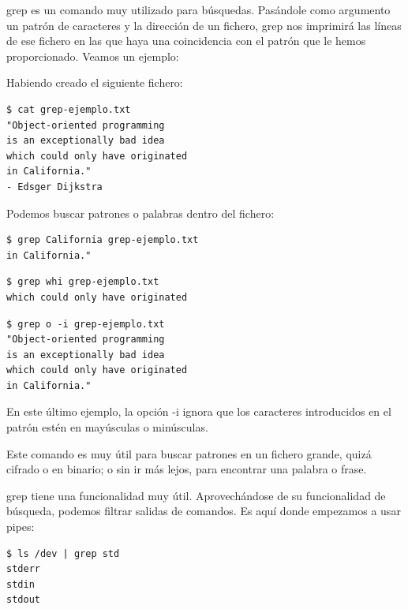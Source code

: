 grep es un comando muy utilizado para búsquedas. Pasándole como argumento un patrón de caracteres y la dirección de un fichero, grep nos imprimirá las líneas de ese fichero en las que haya una coincidencia con el patrón que le hemos proporcionado. Veamos un ejemplo:

Habiendo creado el siguiente fichero:

\begin{tcolorbox-code}
\begin{lstlisting}
$ cat grep-ejemplo.txt
"Object-oriented programming
is an exceptionally bad idea
which could only have originated
in California."
- Edsger Dijkstra
\end{lstlisting}
\end{tcolorbox-code}

Podemos buscar patrones o palabras dentro del fichero:

\begin{tcolorbox-code}
\begin{lstlisting}
$ grep California grep-ejemplo.txt
in California."
\end{lstlisting}
\end{tcolorbox-code}

\begin{tcolorbox-code}
\begin{lstlisting}
$ grep whi grep-ejemplo.txt
which could only have originated
\end{lstlisting}
\end{tcolorbox-code}

\begin{tcolorbox-code}
\begin{lstlisting}
$ grep o -i grep-ejemplo.txt
"Object-oriented programming
is an exceptionally bad idea
which could only have originated
in California."
\end{lstlisting}
\end{tcolorbox-code}

En este último ejemplo, la opción -i ignora que los caracteres introducidos en el patrón estén en mayúsculas o minúsculas.

Este comando es muy útil para buscar patrones en un fichero grande, quizá cifrado o en binario; o sin ir más lejos, para encontrar una palabra o frase.

grep tiene una funcionalidad muy útil. Aprovechándose de su funcionalidad de búsqueda, podemos filtrar salidas de comandos. Es aquí donde empezamos a usar pipes:

\begin{tcolorbox-code}
\begin{lstlisting}
$ ls /dev | grep std
stderr
stdin
stdout
\end{lstlisting}
\end{tcolorbox-code}


